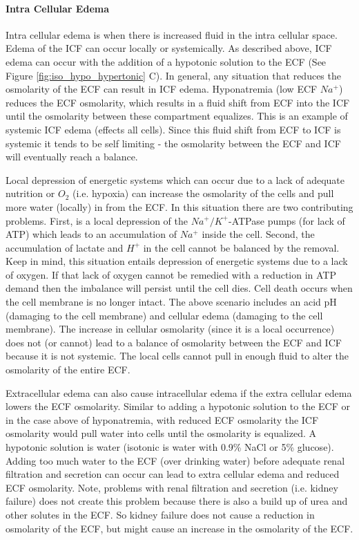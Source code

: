 \paragraph{Intra Cellular Edema}

Intra cellular edema is when there is increased fluid in the intra cellular space. Edema of the ICF can occur locally or systemically. As described above, ICF edema can occur with the addition of a hypotonic solution to the ECF (See Figure \ref{fig:iso_hypo_hypertonic} C). In general, any situation that reduces the osmolarity of the ECF can result in ICF edema. Hyponatremia (low ECF $Na^+$) reduces the ECF osmolarity, which results in a fluid shift from ECF into the ICF until the osmolarity between these compartment equalizes. This is an example of systemic ICF edema (effects all cells). Since this fluid shift from ECF to ICF is systemic it tends to be self limiting - the osmolarity between the ECF and ICF will eventually reach a balance.

Local depression of energetic systems which can occur due to a lack of adequate nutrition or $O_2$ (i.e. hypoxia) can increase the osmolarity of the cells and pull more water (locally) in from the ECF. In this situation there are two contributing problems. First, is a local depression of the $Na^+/K^+$-ATPase pumps (for lack of ATP) which leads to an accumulation of $Na^+$ inside the cell. Second, the accumulation of lactate and $H^+$ in the cell cannot be balanced by the removal. Keep in mind, this situation entails depression of energetic systems due to a lack of oxygen. If that lack of oxygen cannot be remedied with a reduction in ATP demand then the imbalance will persist until the cell dies. Cell death occurs when the cell membrane is no longer intact. The above scenario includes an acid pH (damaging to the cell membrane) and cellular edema (damaging to the cell membrane). The increase in cellular osmolarity (since it is a local occurrence) does not (or cannot) lead to a balance of osmolarity between the ECF and ICF because it is not systemic. The local cells cannot pull in enough fluid to alter the osmolarity of the entire ECF.

Extracellular edema can also cause intracellular edema if the extra cellular edema lowers the ECF osmolarity. Similar to adding a hypotonic solution to the ECF or in the case above of hyponatremia, with reduced ECF osmolarity the ICF osmolarity would pull water into cells until the osmolarity is equalized. A hypotonic solution is water (isotonic is water with 0.9\% NaCl or 5\% glucose). Adding too much water to the ECF (over drinking water) before adequate renal filtration and secretion can occur can lead to extra cellular edema and reduced ECF osmolarity. Note, problems with renal filtration and secretion (i.e. kidney failure) does not create this problem because there is also a build up of urea and other solutes in the ECF. So kidney failure does not cause a reduction in osmolarity of the ECF, but might cause an increase in the osmolarity of the ECF. 

